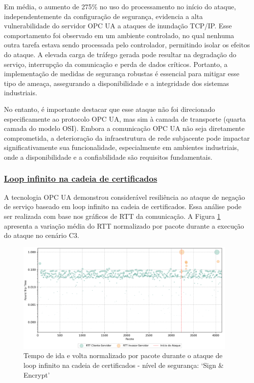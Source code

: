             Em média, o aumento de 275\% no uso do processamento no início do ataque, independentemente da configuração de segurança, evidencia a alta vulnerabilidade do servidor OPC UA a ataques de inundação TCP/IP. Esse comportamento foi observado em um ambiente controlado, no qual nenhuma outra tarefa estava sendo processada pelo controlador, permitindo isolar os efeitos do ataque. A elevada carga de tráfego gerada pode resultar na degradação do serviço, interrupção da comunicação e perda de dados críticos. Portanto, a implementação de medidas de segurança robustas é essencial para mitigar esse tipo de ameaça, assegurando a disponibilidade e a integridade dos sistemas industriais.

            No entanto, é importante destacar que esse ataque não foi direcionado especificamente ao protocolo OPC UA, mas sim à camada de transporte (quarta camada do modelo OSI). Embora a comunicação OPC UA não seja diretamente comprometida, a deterioração da infraestrutura de rede subjacente pode impactar significativamente sua funcionalidade, especialmente em ambientes industriais, onde a disponibilidade e a confiabilidade são requisitos fundamentais.

        \subsubsection*{\underline{Loop infinito na cadeia de certificados}}

            A tecnologia OPC UA demonstrou considerável resiliência ao ataque de negação de serviço baseado em loop infinito na cadeia de certificados. Essa análise pode ser realizada com base nos gráficos de RTT da comunicação. A Figura \ref{fig:0-dos-cert-rttp} apresenta a variação média do RTT normalizado por pacote durante a execução do ataque no cenário C3.

            \begin{figure}[htbp!]
                \caption{\label{fig:0-dos-cert-rttp}Tempo de ida e volta normalizado por pacote durante o ataque de loop infinito na cadeia de certificados - nível de segurança: `Sign \& Encrypt'}
                \begin{center}
                    \includegraphics[width=0.972\textwidth]{USPSC-img/output/cropped/2-dos_certificate_inf_chain_loop-rttp.png}
                \end{center}
            \end{figure}

